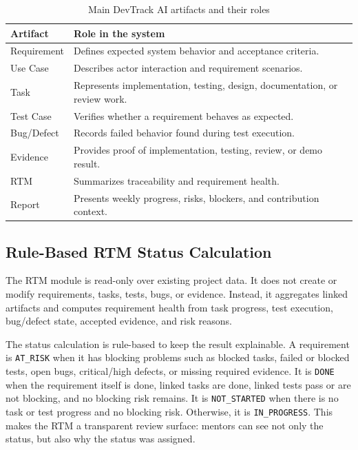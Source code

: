 \documentclass[runningheads]{llncs}
\begin{document}
\begin{table}
\centering
\caption{Main DevTrack AI artifacts and their roles}
\begin{tabular}{ll}
\toprule
\textbf{Artifact} & \textbf{Role in the system} \\
\midrule
Requirement & Defines expected system behavior and acceptance criteria. \\
Use Case & Describes actor interaction and requirement scenarios. \\
Task & Represents implementation, testing, design, documentation, or review work. \\
Test Case & Verifies whether a requirement behaves as expected. \\
Bug/Defect & Records failed behavior found during test execution. \\
Evidence & Provides proof of implementation, testing, review, or demo result. \\
RTM & Summarizes traceability and requirement health. \\
Report & Presents weekly progress, risks, blockers, and contribution context. \\
\bottomrule
\end{tabular}
\end{table}

\subsection{Rule-Based RTM Status Calculation}

The RTM module is read-only over existing project data. It does not create or modify
requirements, tasks, tests, bugs, or evidence. Instead, it aggregates linked
artifacts and computes requirement health from task progress, test execution,
bug/defect state, accepted evidence, and risk reasons.

The status calculation is rule-based to keep the result explainable. A requirement is
\texttt{AT\_RISK} when it has blocking problems such as blocked tasks, failed or
blocked tests, open bugs, critical/high defects, or missing required evidence. It is
\texttt{DONE} when the requirement itself is done, linked tasks are done, linked
tests pass or are not blocking, and no blocking risk remains. It is
\texttt{NOT\_STARTED} when there is no task or test progress and no blocking risk.
Otherwise, it is \texttt{IN\_PROGRESS}. This makes the RTM a transparent review
surface: mentors can see not only the status, but also why the status was assigned.
\end{document}
